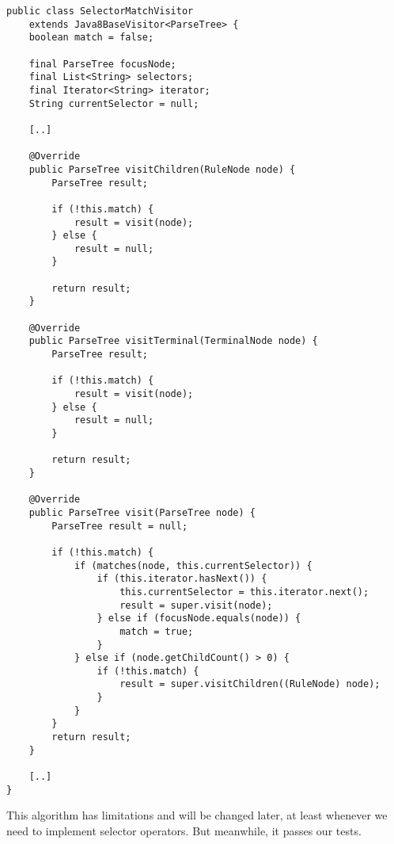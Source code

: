 \documentclass[11pt]{article}
\begin{document}
\begin{verbatim}
public class SelectorMatchVisitor
    extends Java8BaseVisitor<ParseTree> {
    boolean match = false;

    final ParseTree focusNode;
    final List<String> selectors;
    final Iterator<String> iterator;
    String currentSelector = null;

    [..]

    @Override
    public ParseTree visitChildren(RuleNode node) {
        ParseTree result;

        if (!this.match) {
            result = visit(node);
        } else {
            result = null;
        }

        return result;
    }

    @Override
    public ParseTree visitTerminal(TerminalNode node) {
        ParseTree result;

        if (!this.match) {
            result = visit(node);
        } else {
            result = null;
        }

        return result;
    }

    @Override
    public ParseTree visit(ParseTree node) {
        ParseTree result = null;

        if (!this.match) {
            if (matches(node, this.currentSelector)) {
                if (this.iterator.hasNext()) {
                    this.currentSelector = this.iterator.next();
                    result = super.visit(node);
                } else if (focusNode.equals(node)) {
                    match = true;
                }
            } else if (node.getChildCount() > 0) {
                if (!this.match) {
                    result = super.visitChildren((RuleNode) node);
                }
            }
        }
        return result;
    }

    [..]
}
\end{verbatim}

This algorithm has limitations and will be changed later, at least whenever we need to implement selector operators.
But meanwhile, it passes our tests.
\end{document}
